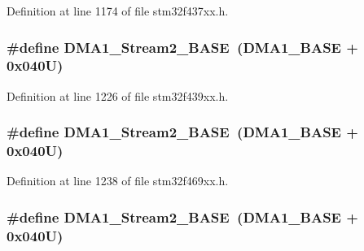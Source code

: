 Definition at line 1174 of file stm32f437xx.\+h.

\subsubsection[{\texorpdfstring{D\+M\+A1\+\_\+\+Stream2\+\_\+\+B\+A\+SE}{DMA1_Stream2_BASE}}]{\setlength{\rightskip}{0pt plus 5cm}\#define D\+M\+A1\+\_\+\+Stream2\+\_\+\+B\+A\+SE~({\bf D\+M\+A1\+\_\+\+B\+A\+SE} + 0x040\+U)}\hypertarget{group___peripheral__memory__map_ga48a551ee91d3f07dd74347fdb35c703d}{}\label{group___peripheral__memory__map_ga48a551ee91d3f07dd74347fdb35c703d}


Definition at line 1226 of file stm32f439xx.\+h.

\subsubsection[{\texorpdfstring{D\+M\+A1\+\_\+\+Stream2\+\_\+\+B\+A\+SE}{DMA1_Stream2_BASE}}]{\setlength{\rightskip}{0pt plus 5cm}\#define D\+M\+A1\+\_\+\+Stream2\+\_\+\+B\+A\+SE~({\bf D\+M\+A1\+\_\+\+B\+A\+SE} + 0x040\+U)}\hypertarget{group___peripheral__memory__map_ga48a551ee91d3f07dd74347fdb35c703d}{}\label{group___peripheral__memory__map_ga48a551ee91d3f07dd74347fdb35c703d}


Definition at line 1238 of file stm32f469xx.\+h.

\subsubsection[{\texorpdfstring{D\+M\+A1\+\_\+\+Stream2\+\_\+\+B\+A\+SE}{DMA1_Stream2_BASE}}]{\setlength{\rightskip}{0pt plus 5cm}\#define D\+M\+A1\+\_\+\+Stream2\+\_\+\+B\+A\+SE~({\bf D\+M\+A1\+\_\+\+B\+A\+SE} + 0x040\+U)}\hypertarget{group___peripheral__memory__map_ga48a551ee91d3f07dd74347fdb35c703d}{}\label{group___peripheral__memory__map_ga48a551ee91d3f07dd74347fdb35c703d}


